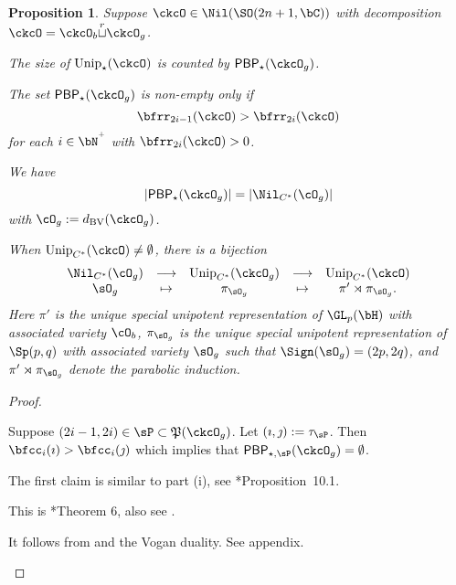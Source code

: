 \documentclass[12pt,a4paper]{amsart}
\def\abs#1{\left|{#1}\right|}
\numberwithin{equation}{section}
\newtheorem{prop}[thm]{Proposition}
\theoremstyle{remark}
\def\Unip{\mathrm{Unip}}
\def\dBV{d_{\mathrm{BV}}}
\def\cuprow{{\stackrel{r}{\sqcup}}}
\def\CPP{\mathfrak{P}}
\begin{document}
\begin{prop}
  Suppose $\ckcO\in \Nil(\SO(2n+1,\bC))$ with decomposition
  $\ckcO = \ckcO_{b}\cuprow \ckcO_{g}$.
  \begin{enumT}
    \item The size of $\Unip_{\star}(\ckcO)$ is counted by
    $\PBP_{\star}(\ckcO_{g})$.
    \item The set $\PBP_{\star}(\ckcO_{g})$ is non-empty only if
    \[
      \bfrr_{2i-1}(\ckcO)> \bfrr_{2i}(\ckcO)
    \]
    for each $i\in \bN^{^{+}}$ with $\bfrr_{2i}(\ckcO)>0$.
    \item We have
    \[
      \abs{\PBP_{\star}(\ckcO_{g})} = \abs{\Nil_{C^{*}}(\cO_{g})}
    \]
    with $\cO_{g} := \dBV(\ckcO_{g})$.
    \item When $\Unip_{C^{*}}(\ckcO)\neq \emptyset$, there is a bijection
    \[
      \begin{array}{ccccc}
        \Nil_{C^{*}}(\cO_{g})& \longrightarrow & \Unip_{C^{*}}(\ckcO_{g})
        &\longrightarrow &\Unip_{C^{*}}(\ckcO) \\
        \sO_{g} & \mapsto & \pi_{\sO_{g}} & \mapsto
                         & \pi'\rtimes \pi_{\sO_{g}}.
      \end{array}
    \]
    Here $\pi'$ is the unique special unipotent representation of $\GL_p(\bH)$
    with associated variety $\cO_{b}$, $\pi_{\sO_{g}}$ is the unique special
    unipotent representation of $\Sp(p,q)$ with associated variety $\sO_{g}$
    such that $\Sign(\sO_{g}) = (2p,2q)$, and $\pi'\rtimes \pi_{\sO_{g}}$ denote
    the parabolic induction.
  \end{enumT}
\end{prop}
\begin{proof}
  \begin{enumPF}
    \item
    Suppose $(2i-1,2i)\in \sP\subset \CPP(\ckcO_{g})$.
    Let $(\imath,\jmath) :=\tau_{\sP}$. Then
    $\bfcc_{i}(\imath)>\bfcc_{i}(\jmath)$ which implies that
    $\PBP_{\star,\sP}(\ckcO_{g}) = \emptyset$.
    \item
    The first claim is similar to part (i), see \cite{BMSZ2}*{Proposition~10.1}.
    \item This is \cite{Mc}*{Theorem 6}, also see \cite{BMSZ2}.
    \item
    It follows from  and the Vogan duality.
    See appendix.
  \end{enumPF}
\end{proof}
\end{document}
